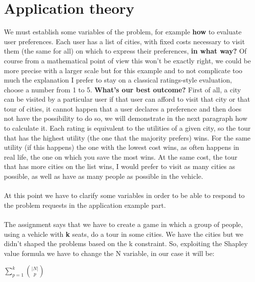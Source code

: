 \documentclass{article}
\begin{document}
\section{Application theory}
\Large{
We must establish some variables of the problem, for example \textbf{how} to evaluate user preferences. Each user has a list of cities, with fixed costs necessary to visit them (the same for all) on which to express their preferences, \textbf{in what way?} Of course from a mathematical point of view this won't be exactly right, we could be more precise with a larger scale but for this example and to not complicate too much the explanation I prefer to stay on a classical ratings-style evaluation, choose a number from 1 to 5. \textbf{What's our best outcome?} First of all, a city can be visited by a particular user if that user can afford to visit that city or that tour of cities, it cannot happen that a user declares a preference and then does not have the possibility to do so, we will demonstrate in the next paragraph how to calculate it. Each rating is equivalent to the utilities of a given city, so the tour that has the highest utility (the one that the majority prefers) wins. For the same utility (if this happens) the one with the lowest cost wins, as often happens in real life, the one on which you save the most wins. At the same cost, the tour that has more cities on the list wins, I would prefer to visit as many cities as possible, as well as have as many people as possible in the vehicle. \\\\At this point we have to clarify some variables in order to be able to respond to the problem requests in the application example part.\\\\
The assignment says that we have to create a game in which a group of people, using a vehicle with \textbf{k} seats, do a tour in some cities. We have the cities but we didn't shaped the problems based on the k constraint. So, exploiting the Shapley value formula we have to change the N variable, in our case it will be:
\begin{center}
    $\displaystyle\sum_{p=1}^k \binom {{\vert N \vert}} {p}$
\end{center}
}
\end{document}
